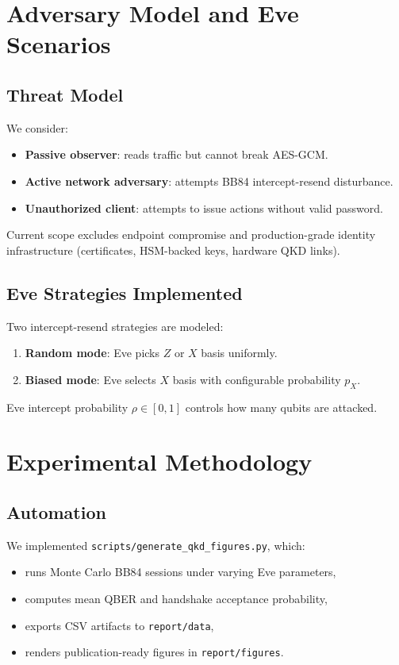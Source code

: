 \documentclass[11pt,a4paper]{article}
\begin{document}
\section{Adversary Model and Eve Scenarios}
\subsection{Threat Model}
We consider:
\begin{itemize}[leftmargin=1.5em]
  \item \textbf{Passive observer}: reads traffic but cannot break AES-GCM.
  \item \textbf{Active network adversary}: attempts BB84 intercept-resend disturbance.
  \item \textbf{Unauthorized client}: attempts to issue actions without valid password.
\end{itemize}

Current scope excludes endpoint compromise and production-grade identity infrastructure (certificates, HSM-backed keys, hardware QKD links).

\subsection{Eve Strategies Implemented}
Two intercept-resend strategies are modeled:
\begin{enumerate}[leftmargin=1.5em]
  \item \textbf{Random mode}: Eve picks $Z$ or $X$ basis uniformly.
  \item \textbf{Biased mode}: Eve selects $X$ basis with configurable probability $p_X$.
\end{enumerate}
Eve intercept probability $\rho \in [0,1]$ controls how many qubits are attacked.

\section{Experimental Methodology}
\subsection{Automation}
We implemented \texttt{scripts/generate\_qkd\_figures.py}, which:
\begin{itemize}[leftmargin=1.5em]
  \item runs Monte Carlo BB84 sessions under varying Eve parameters,
  \item computes mean QBER and handshake acceptance probability,
  \item exports CSV artifacts to \texttt{report/data},
  \item renders publication-ready figures in \texttt{report/figures}.
\end{itemize}
\end{document}
